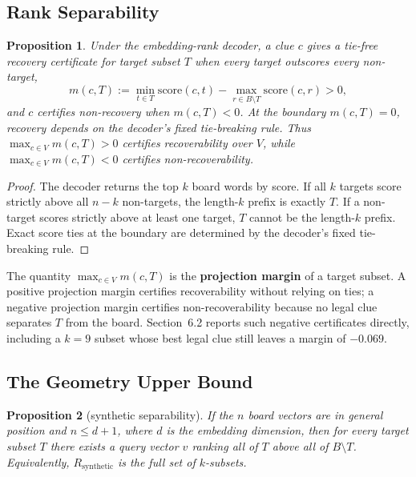 \documentclass[11pt]{article}
\newtheorem{proposition}{Proposition}
\begin{document}
\subsection{Rank Separability}

\begin{proposition}\label{prop:rank}
Under the embedding-rank decoder, a clue $c$ gives a tie-free recovery
certificate for target subset $T$ when every target outscores every non-target,
\[
  m(c, T) := \min_{t \in T} \mathrm{score}(c, t)
             - \max_{r \in B \setminus T} \mathrm{score}(c, r) > 0,
\]
and $c$ certifies non-recovery when $m(c, T) < 0$. At the boundary
$m(c, T) = 0$, recovery depends on the decoder's fixed tie-breaking rule. Thus
$\max_{c \in V} m(c, T) > 0$ certifies recoverability over $V$, while
$\max_{c \in V} m(c, T) < 0$ certifies non-recoverability.
\end{proposition}

\begin{proof}
The decoder returns the top $k$ board words by score. If all $k$ targets score
strictly above all $n - k$ non-targets, the length-$k$ prefix is exactly $T$. If
a non-target scores strictly above at least one target, $T$ cannot be the
length-$k$ prefix. Exact score ties at the boundary are determined by the
decoder's fixed tie-breaking rule.
\end{proof}

The quantity $\max_{c \in V} m(c, T)$ is the \textbf{projection margin} of a
target subset. A positive projection margin certifies recoverability without
relying on ties; a negative projection margin certifies non-recoverability
because no legal clue separates $T$ from the board. Section~6.2 reports such
negative certificates directly, including a $k = 9$ subset whose best legal clue
still leaves a margin of $-0.069$.

\subsection{The Geometry Upper Bound}

\begin{proposition}[synthetic separability]\label{prop:geometry}
If the $n$ board vectors are in general position and $n \le d + 1$, where $d$ is
the embedding dimension, then for every target subset $T$ there exists a query
vector $v$ ranking all of $T$ above all of $B \setminus T$. Equivalently,
$R_{\mathrm{synthetic}}$ is the full set of $k$-subsets.
\end{proposition}
\end{document}
